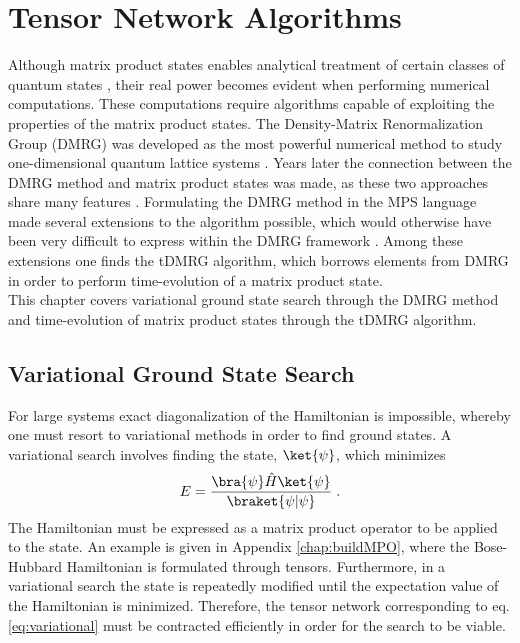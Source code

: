 \chapter{Tensor Network Algorithms}
Although matrix product states enables analytical treatment of certain classes of quantum states \cite{Baxter1968,Affleck1987}, their real power becomes evident when performing numerical computations. These computations require algorithms capable of exploiting the properties of the matrix product states. The Density-Matrix Renormalization Group (DMRG) was developed as the most powerful numerical method to study one-dimensional quantum lattice systems \cite{White1992,White1993}. Years later the connection between the DMRG method and matrix product states was made, as these two approaches share many features \cite{Ostlund1995, Dukelsky1998}. Formulating the DMRG method in the MPS language made several extensions to the algorithm possible, which would otherwise have been very difficult to express within the DMRG framework \cite{schollwock}. Among these extensions one finds the tDMRG algorithm, which borrows elements from DMRG in order to perform time-evolution of a matrix product state.\\
This chapter covers variational ground state search through the DMRG method and time-evolution of matrix product states through the tDMRG algorithm.


\section{Variational Ground State Search}
For large systems exact diagonalization of the Hamiltonian is impossible, whereby one must resort to variational methods in order to find ground states. A variational search involves finding the state, $\ket{\psi}$, which minimizes
\begin{equation}
	E = \frac{\bra{\psi} \hat{H} \ket{\psi}}{\braket{\psi | \psi}} \; .
	\label{eq:variational}
\end{equation}
The Hamiltonian must be expressed as a matrix product operator to be applied to the state. An example is given in Appendix \ref{chap:buildMPO}, where the Bose-Hubbard Hamiltonian is formulated through tensors. Furthermore, in a variational search the state is repeatedly modified until the expectation value of the Hamiltonian is minimized. Therefore, the tensor network corresponding to eq. \ref{eq:variational} must be contracted efficiently in order for the search to be viable.


